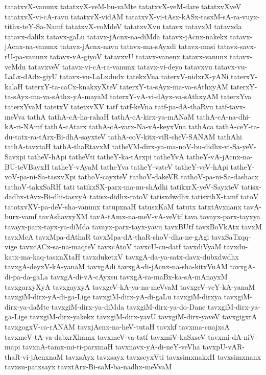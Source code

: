 {tatatxvX-vanunx
tatatxvX-veM-bu-vaMte
tatatxvX-veM-dare
tatatxvXveV
tatatxvX-vi-cA-ravu
tatatxvX-vidAM
tatatxvX-vi-tAsx-kASx-tasxM-sA-ra-vuyx-tithx-teY-Sa-Namf
tatatxvX-voMdeV
tatatxvXvu
tatavx
tatavxM
tatavxda
tatavx-dalilx
tatavx-gaLu
tatavx-jAcnx-na-diMda
tatavx-jAcnx-nakekx
tatavx-jAcnx-na-vanunx
tatavx-jAcnx-navu
tatavx-ma-sAyxdi
tatavx-masi
tatavx-savx-rU-pa-vanunx
tatavx-vA-giyoV
tatavxvU
tatavx-vanenx
tatavx-vanunx
tatavx-veMdu
tatavxveV
tatavx-vi-cA-ra-vanunx
tatavx-vi-deyo
tatavxvu
tatavx-vu-LaLx-dAdx-giyU
tatavx-vu-LaLxdudx
tatekxVna
taterxV-nidxrX-yANi
taterxY-kalaH
taterxY-ta-caCx-knakxyXteV
taterxY-ta-sAyx-ma-va-sAthxyAM
taterxY-ta-sAyx-ma-va-sAthx-yA-mayaM
taterxY-vA-vi-dAyx-va-sAthxyAM
taterxYva
taterxYvaM
tatetxV
tatetxvXV
tatf
tatf-keVna
tatf-pa-dA-thaRvu
tatf-tavx-meVva
tathA
tathA-cA-ha-rahaH
tathA-cA-kirx-ya-mANaM
tathA-cA-na-dhi-kA-ri-NAmf
tathA-cAtarx
tathA-cA-varx-Na-vA-keyxVna
tathAca
tathA-ceY-ta-du-tatx-ra-tArx-Bi-dhA-sayxteV
tathA-coV-kitx-viR-sheV-SANAM
tathAhi
tathA-tavxtaH
tathA-thaRtavxM
tatheVM-dirx-ya-ma-noV-bu-didhx-vi-Sa-yeV-Savxpi
tatheV-hApi
tatheVti
tatheY-ka-tArxpi
tatheYvA
tatheY-vA-jAcnx-na-BU-teVBayxH
tatheY-vAyaM
tatheYva
tatheY-vateV
tatheY-veV-hApi
tatheY-voV-pa-ni-Sa-tasxvXpi
tathoV-cayxteV
tathoV-dakeVR
tathoV-pa-ni-Sa-dashacx
tathoV-takxSaRH
tati
tatikxSX-parx-ma-nu-shAdhi
tatikxrX-yeV-SayxteV
tatisx-dadhx-tAvx-Bi-dhi-tasxyA
tatisx-didhx-ratoV
tatisxdwdhx
tatisxthX-tamf
tatoV
tatotxvXV-pa-deV-sha-vanunx
tatupxnaH
tatusxKaM
tatutx
tatxtAvxnanx
tavA-burx-vamf
tavAshavxyXM
tavA-tAmx-na-meV-vA-veVtf
tava
tavayx-parx-tayxya
tavayx-parx-tayx-ya-diMda
tavayx-parx-tayx-yavu
tavxBUtf
tavxBoVkAtx
tavxM
tavxMcA
tavxMpa-dAthaR
tavxMpa-dA-thaR-shoV-dha-ne-gAgi
tavxSaTxqq-vige
tavxcACx-sa-na-maqteV
tavxcAtoV
tavxcU-cu-datf
tavxdiVyaM
tavxdu-katx-ma-kaq-tasxnXtaH
tavxduketxV
tavxgA-da-ya-satx-davx-dubxdwdhx
tavxgA-deyxV-kA-yanaM
tavxgAdi
tavxgA-di-jAcnx-na-sha-kitxVnAM
tavxgA-di-pa-da-gaLa
tavxgA-di-vA-cAyxsu
tavxgA-ra-maBx-ka-sA-mAnayxM
tavxgarxyXyA
tavxgayxyA
tavxgeV-kA-ya-na-meVvaM
tavxgeV-veY-kA-yanaM
tavxgiM-dirx-yA-di-ga-Lige
tavxgiM-dirx-yA-di-gaLu
tavxgiM-dirxya
tavxgiM-dirx-ya-daMte
tavxgiM-dirx-ya-diMda
tavxgiM-dirx-ya-do-Dane
tavxgiM-dirx-ya-ga-Lige
tavxgiM-dirx-yakekx
tavxgiM-dirx-yavU
tavxgiM-dirx-yaveV
tavxgigxrA
tavxgogxV-ca-rANAM
tavxjAcnx-na-heV-tutaH
tavxkf
tavxma-cnajxsA
tavxmeV-tA-va-dabxrXhamx
tavxmeV-va-tatf
tavxmiV-kaSxseV
tavxmi-dA-niV-mapi
tavxnA-tamx-mi-ti-parxmaH
tavxnavx-yA-di-neY-veVha
tavxpU-vAR-thaR-vi-jAcnxnaM
tavxsAyx
tavxsayx
tavxseyxVti
tavxsimxnakxH
tavxsimxnanx
tavxsu-patxsayx
tavxtArx-Bi-saM-ba-nadhx-meVvaM
}
